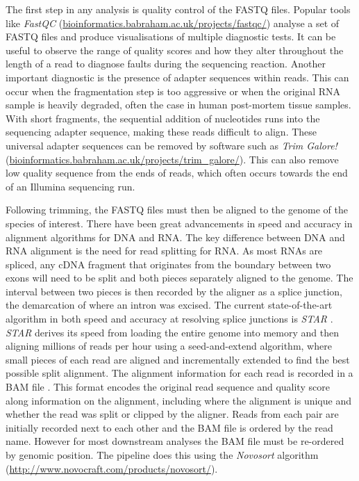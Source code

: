 The first step in any analysis is quality control of the FASTQ files. 
Popular tools like \textit{FastQC} (\url{bioinformatics.babraham.ac.uk/projects/fastqc/}) analyse a set of FASTQ files and produce visualisations of multiple diagnostic tests. 
It can be useful to observe the range of quality scores and how they alter throughout the length of a read to diagnose faults during the sequencing reaction. 
Another important diagnostic is the presence of adapter sequences within reads. 
This can occur when the fragmentation step is too aggressive or when the original RNA sample is heavily degraded, often the case in human post-mortem tissue samples. 
With short fragments, the sequential addition of nucleotides runs into the sequencing adapter sequence, making these reads difficult to align. 
These universal adapter sequences can be removed by software such as \textit{Trim Galore!} (\url{bioinformatics.babraham.ac.uk/projects/trim_galore/}).
This can also remove low quality sequence from the ends of reads, which often occurs towards the end of an Illumina sequencing run. 

Following trimming, the FASTQ files must then be aligned to the genome of the species of interest. 
There have been great advancements in speed and accuracy in alignment algorithms for DNA and RNA. 
The key difference between DNA and RNA alignment is the need for read splitting for RNA. 
As most RNAs are spliced, any cDNA fragment that originates from the boundary between two exons will need to be split and both pieces separately aligned to the genome. 
The interval between two pieces is then recorded by the aligner as a splice junction, the demarcation of where an intron was excised. 
The current state-of-the-art algorithm in both speed and accuracy at resolving splice junctions is \textit{STAR} \citep{Dobin2013-ra}.
\textit{STAR} derives its speed from loading the entire genome into memory and then aligning millions of reads per hour using a seed-and-extend algorithm, where small pieces of each read are aligned and incrementally extended to find the best possible split alignment. 
The alignment information for each read is recorded in a BAM file \citep{Li2009-hm}. 
This format encodes the original read sequence and quality score along information on the alignment, including where the alignment is unique and whether the read was split or clipped by the aligner.
Reads from each pair are initially recorded next to each other and the BAM file is ordered by the read name. 
However for most downstream analyses the BAM file must be re-ordered by genomic position. 
The pipeline does this using the \textit{Novosort} algorithm (\url{http://www.novocraft.com/products/novosort/}). 

